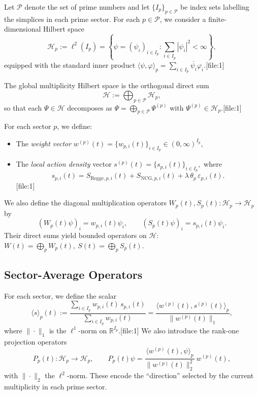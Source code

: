 \documentclass[11pt]{article}
\begin{document}
Let \(\mathcal{P}\) denote the set of prime numbers and let
\(\{I_p\}_{p \in \mathcal{P}}\) be index sets labelling the simplices in
each prime sector. For each \(p \in \mathcal{P}\), we consider a
finite-dimensional Hilbert space
\[
  \mathcal{H}_p
  := \ell^2(I_p)
  = \left\{
      \psi = (\psi_i)_{i \in I_p}
      : \sum_{i \in I_p} |\psi_i|^2 < \infty
    \right\},
\]
equipped with the standard inner product
\(
  \langle \psi, \varphi \rangle_p
  = \sum_{i \in I_p} \overline{\psi_i} \varphi_i.
\)[file:1]

The global multiplicity Hilbert space is the orthogonal direct sum
\begin{equation}
  \mathcal{H}
  := \bigoplus_{p \in \mathcal{P}} \mathcal{H}_p,
\end{equation}
so that each \(\Psi \in \mathcal{H}\) decomposes as
\(
  \Psi = \bigoplus_{p \in \mathcal{P}} \Psi^{(p)}
\)
with \(\Psi^{(p)} \in \mathcal{H}_p\).[file:1]

For each sector \(p\), we define:
\begin{itemize}
  \item The \emph{weight vector}
  \(
    w^{(p)}(t) = \{w_{p,i}(t)\}_{i \in I_p} \in (0,\infty)^{I_p}
  \),
  \item The \emph{local action density} vector
  \(
    s^{(p)}(t) = \{ s_{p,i}(t) \}_{i \in I_p},
  \)
  where
  \begin{equation}
    s_{p,i}(t)
      = S_{\mathrm{Regge},p,i}(t)
        + S_{\mathrm{NCG},p,i}(t)
        + \lambda\,\theta_p\,\varepsilon_{p,i}(t).
  \end{equation}[file:1]
\end{itemize}

We also define the diagonal multiplication operators
\(
  W_p(t), S_p(t) : \mathcal{H}_p \to \mathcal{H}_p
\)
by
\begin{equation}
  (W_p(t)\psi)_i = w_{p,i}(t)\psi_i,
  \qquad
  (S_p(t)\psi)_i = s_{p,i}(t)\psi_i.
\end{equation}
Their direct sums yield bounded operators on \(\mathcal{H}\):
\(
  W(t) = \bigoplus_p W_p(t),
  \ S(t) = \bigoplus_p S_p(t).
\)

\subsection{Sector-Average Operators}

For each sector, we define the scalar
\begin{equation}
  \langle s \rangle_p(t)
    := \frac{\sum_{i \in I_p} w_{p,i}(t)\,s_{p,i}(t)}
             {\sum_{i \in I_p} w_{p,i}(t)}
  = \frac{
      \langle w^{(p)}(t), s^{(p)}(t) \rangle_p
    }{
      \|w^{(p)}(t)\|_1
    },
\end{equation}
where \(\|\cdot\|_1\) is the \(\ell^1\)-norm on \(\mathbb{R}^{I_p}\).[file:1]
We also introduce the rank-one projection operators
\begin{equation}
  P_p(t) : \mathcal{H}_p \to \mathcal{H}_p,
  \qquad
  P_p(t)\psi
    = \frac{\langle w^{(p)}(t), \psi \rangle_p}{\|w^{(p)}(t)\|_2^2}
      \, w^{(p)}(t),
\end{equation}
with \(\|\cdot\|_2\) the \(\ell^2\)-norm. These encode the ``direction''
selected by the current multiplicity in each prime sector.
\end{document}
